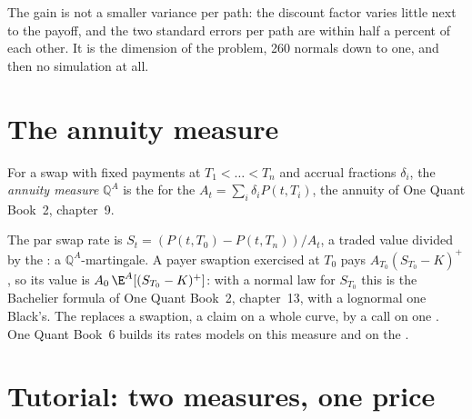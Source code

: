 The gain is not a smaller variance per path: the discount factor varies little next to the
payoff, and the two standard errors per path are within half a percent of each other. It is the
dimension of the problem, 260 normals down to one, and then no simulation at all.

\section{The annuity measure}

\begin{definition}\label{def:qm:girsanov-and-changes-of-numeraire:annuity}
For a swap with fixed payments at $T_1 < \dots < T_n$ and accrual fractions $\delta_i$, the \emph{annuity
measure} $\mathbb Q^A$ is the  for the  $A_t =
\sum_i\delta_iP(t, T_i)$, the annuity of One Quant Book~2, chapter~9.
\end{definition}

The par swap rate is $S_t = (P(t, T_0) - P(t, T_n))/A_t$, a traded value divided by the :
a $\mathbb Q^A$-martingale. A payer swaption exercised at $T_0$ pays $A_{T_0}(S_{T_0} - K)^+$, so its value is $A_0\,\E^A[(S_{T_0}
- K)^+]$: with a normal law for $S_{T_0}$ this is the Bachelier formula of One Quant Book~2,
chapter~13, with a lognormal one Black's. The  replaces a swaption, a claim on
a whole curve, by a call on one . One Quant Book~6 builds its rates models on this
measure and on the .

\section{Tutorial: two measures, one price}\label{tut:qm:girsanov-and-changes-of-numeraire:caplet}

